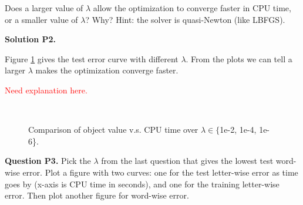 \documentclass[11pt]{report}
\begin{document}
Does a larger value of $\lambda$ allow the optimization to converge faster in CPU time,
or a smaller value of $\lambda$?  Why?
Hint: the solver is quasi-Newton (like LBFGS).

{\bf Solution P2.}

Figure \ref{fig:compare_cpuTime} gives the test error curve with different $\lambda$. From the plots we can tell a larger $\lambda$ makes the optimization converge faster. 

{\textcolor{red}{Need explanation here.}

\begin{figure}[t]
\centering
{}
~~
~~
\caption{Comparison of object value v.s. CPU time over $\lambda \in \{${\sf 1e-2, 1e-4, 1e-6}\}.}
\label{fig:compare_cpuTime}
\end{figure}

{\bf Question P3.}
Pick the $\lambda$ from the last question that gives the lowest test word-wise error.
Plot a figure with two curves:
one for the test letter-wise error as time goes by (x-axis is CPU time in seconds),
and one for the training letter-wise error.
Then plot another figure for word-wise error.

}
\end{document}
